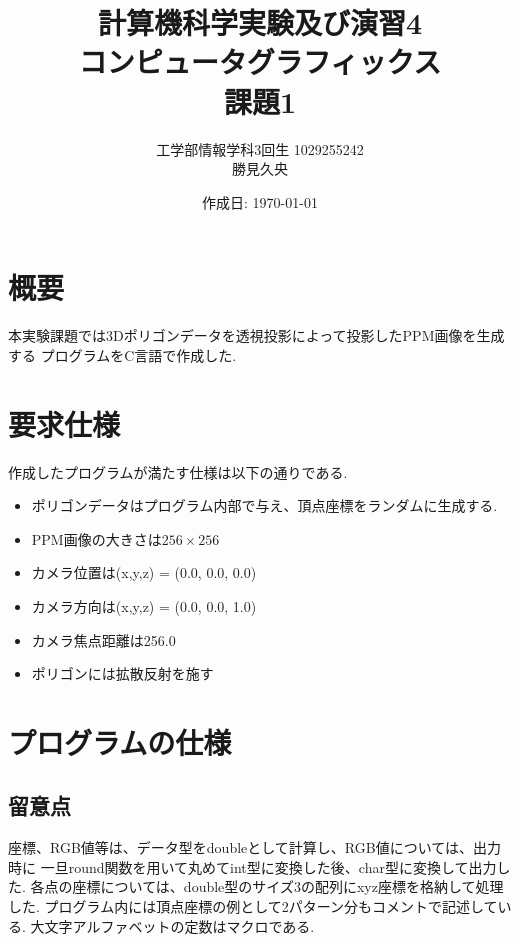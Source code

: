 \documentclass[a4j,dvipdfmx]{jsarticle}
\begin{document}
\title{計算機科学実験及び演習4\\コンピュータグラフィックス\\課題1}
\author{工学部情報学科3回生 1029255242\\勝見久央}
\date{作成日: \today} %
\maketitle
\section{概要}
本実験課題では3Dポリゴンデータを透視投影によって投影したPPM画像を生成する
プログラムをC言語で作成した.

\section{要求仕様}
作成したプログラムが満たす仕様は以下の通りである.
\begin{itemize}
\item ポリゴンデータはプログラム内部で与え、頂点座標をランダムに生成する.
\item PPM画像の大きさは$256 \times 256$
\item カメラ位置は(x,y,z) = (0.0, 0.0, 0.0)
\item カメラ方向は(x,y,z) = (0.0, 0.0, 1.0)
\item カメラ焦点距離は256.0
\item ポリゴンには拡散反射を施す
\end{itemize}

\section{プログラムの仕様}
\subsection{留意点}
座標、RGB値等は、データ型をdoubleとして計算し、RGB値については、出力時に
一旦round関数を用いて丸めてint型に変換した後、char型に変換して出力した.
各点の座標については、double型のサイズ3の配列にxyz座標を格納して処理した.
プログラム内には頂点座標の例として2パターン分もコメントで記述している.
大文字アルファベットの定数はマクロである.
\end{document}
